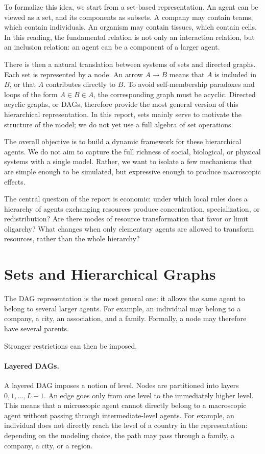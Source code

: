 \documentclass[11pt]{article}
\begin{document}
To formalize this idea, we start from a set-based representation. An agent can be viewed as a set, and its components as subsets. A company may contain teams, which contain individuals. An organism may contain tissues, which contain cells. In this reading, the fundamental relation is not only an interaction relation, but an inclusion relation: an agent can be a component of a larger agent.

There is then a natural translation between systems of sets and directed graphs. Each set is represented by a node. An arrow $A \to B$ means that $A$ is included in $B$, or that $A$ contributes directly to $B$. To avoid self-membership paradoxes and loops of the form $A \in B \in A$, the corresponding graph must be acyclic. Directed acyclic graphs, or DAGs, therefore provide the most general version of this hierarchical representation. In this report, sets mainly serve to motivate the structure of the model; we do not yet use a full algebra of set operations.

The overall objective is to build a dynamic framework for these hierarchical agents. We do not aim to capture the full richness of social, biological, or physical systems with a single model. Rather, we want to isolate a few mechanisms that are simple enough to be simulated, but expressive enough to produce macroscopic effects.

The central question of the report is economic: under which local rules does a hierarchy of agents exchanging resources produce concentration, specialization, or redistribution? Are there modes of resource transformation that favor or limit oligarchy? What changes when only elementary agents are allowed to transform resources, rather than the whole hierarchy?

\section{Sets and Hierarchical Graphs}

The DAG representation is the most general one: it allows the same agent to belong to several larger agents. For example, an individual may belong to a company, a city, an association, and a family. Formally, a node may therefore have several parents.

Stronger restrictions can then be imposed.

\paragraph{Layered DAGs.}
A layered DAG imposes a notion of level. Nodes are partitioned into layers $0,1,\ldots,L-1$. An edge goes only from one level to the immediately higher level. This means that a microscopic agent cannot directly belong to a macroscopic agent without passing through intermediate-level agents. For example, an individual does not directly reach the level of a country in the representation: depending on the modeling choice, the path may pass through a family, a company, a city, or a region.
\end{document}
